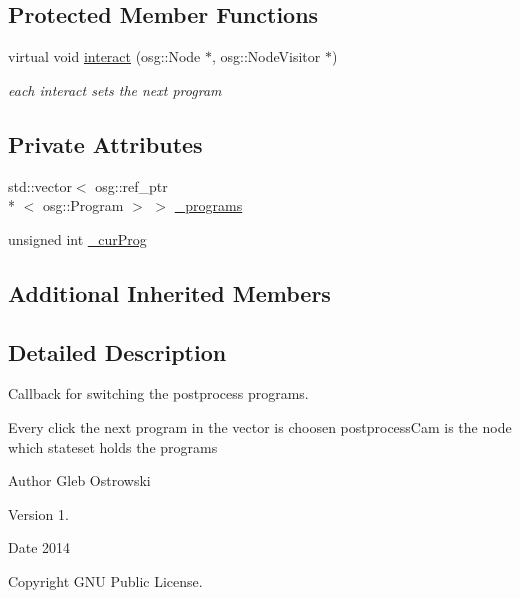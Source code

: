 \subsection*{Protected Member Functions}
\begin{DoxyCompactItemize}
\item 
virtual void \hyperlink{classbrtr_1_1_program_switcher_callback_a06dd3fc2b09d3138e67599d8d56db62a}{interact} (osg\+::\+Node $\ast$, osg\+::\+Node\+Visitor $\ast$)
\begin{DoxyCompactList}\small\item\em each interact sets the next program \end{DoxyCompactList}\end{DoxyCompactItemize}
\subsection*{Private Attributes}
\begin{DoxyCompactItemize}
\item 
std\+::vector$<$ osg\+::ref\+\_\+ptr\\*
$<$ osg\+::\+Program $>$ $>$ \hyperlink{classbrtr_1_1_program_switcher_callback_a9cbcf4d65f6ee468bb20d16b9e795e49}{\+\_\+programs}
\item 
unsigned int \hyperlink{classbrtr_1_1_program_switcher_callback_a06ee6d68fe703e6a88960219b019f1bd}{\+\_\+cur\+Prog}
\end{DoxyCompactItemize}
\subsection*{Additional Inherited Members}


\subsection{Detailed Description}
Callback for switching the postprocess programs. 

Every click the next program in the vector is choosen postprocess\+Cam is the node which stateset holds the programs \begin{DoxyAuthor}{Author}
Gleb Ostrowski 
\end{DoxyAuthor}
\begin{DoxyVersion}{Version}
1. 
\end{DoxyVersion}
\begin{DoxyDate}{Date}
2014 
\end{DoxyDate}
\begin{DoxyCopyright}{Copyright}
G\+N\+U Public License. 
\end{DoxyCopyright}


